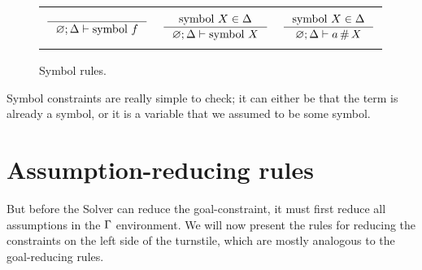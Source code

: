 \documentclass[english, mgr]{iithesis}
\newcommand{\solverRule}{\vdash}
\begin{document}
\begin{figure}[htbp]
    \centering
    \begin{tabularx}{\textwidth}{|CCC|}
      \hline & & \\ $
      \inference{
      }{
        \emptyenv ; \icEnv \solverRule \csymb \symb
      }
      $ & $
      \inference{
        \csymb \termv \in \icEnv
      }{
        \emptyenv ; \icEnv \solverRule \csymb \termv
      }
      $ & $
      \inference{
        \csymb \termv \in \icEnv
      }{
        \emptyenv ; \icEnv \solverRule \atomv \cfresh \termv
      }
      $ \\ & & \\ \hline
      \end{tabularx}
  \caption{Symbol rules.}
  \label{fig:symbol-rules}
\end{figure}
Symbol constraints are really simple to check; it can either be that the term is already
a symbol, or it is a variable that we assumed to be some symbol.

\section{Assumption-reducing rules}
But before the Solver can reduce the goal-constraint, it must first reduce all assumptions in the $\Gamma$ environment.
We will now present the rules for reducing the constraints on the left side of the turnstile,
which are mostly analogous to the goal-reducing rules.
\end{document}
